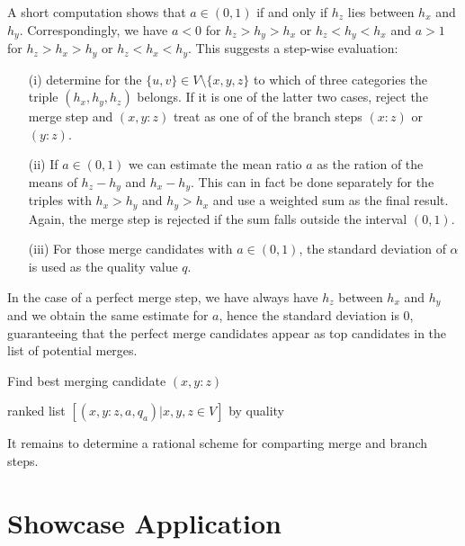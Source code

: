 \documentclass[amsmath]{lni}
\begin{document}
A short computation shows that $a\in(0,1)$ if and only if $h_z$ lies
between $h_x$ and $h_y$. Correspondingly, we have $a<0$ for $h_z>h_y>h_x$
or $h_z<h_y<h_x$ and $a>1$ for $h_z>h_x>h_y$ or $h_z<h_x<h_y$.  This
suggests a step-wise evaluation:
\begin{itemize} 
\item[(i)] determine for the $\{u,v\}\in V\setminus\{x,y,z\}$ to which of
  three categories the triple $(h_x,h_y,h_z)$ belongs. If it is one of the
  latter two cases, reject the merge step and $(x,y:z)$ treat as one of of
  the branch steps $(x:z)$ or $(y:z)$.
\item[(ii)] If $a\in(0,1)$ we can estimate the mean ratio $a$ as the ration
  of the means of $h_z-h_y$ and $h_x-h_y$. This can in fact be done
  separately for the triples with $h_x>h_y$ and $h_y>h_x$ and use a
  weighted sum as the final result. Again, the merge step is rejected if
  the sum falls outside the interval $(0,1)$. 
\item[(iii)] For those merge candidates with $a\in(0,1)$, the standard
  deviation of $\alpha$ is used as the quality value $q$.
\end{itemize}
In the case of a perfect merge step, we have always have $h_z$ between
$h_x$ and $h_y$ and we obtain the same estimate for $a$, hence the standard
deviation is $0$, guaranteeing that the perfect merge candidates appear as
top candidates in the list of potential merges.

\begin{algorithm}[H]
\caption{Find best merging candidate $(x,y:z)$ } 
\label{alg:mergestep}

\Return ranked list $[(x,y:z,a,q_a)| x,y,z\in V]$ by quality\;
\end{algorithm} 

It remains to determine a rational scheme for comparting merge and branch
steps.

\section{Showcase Application}
\end{document}
